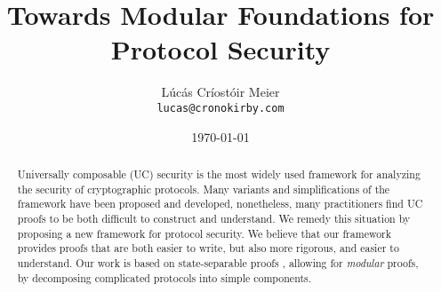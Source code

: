 

\date{\today}
\title{Towards Modular Foundations for\\ Protocol Security}
\author{Lúcás Críostóir Meier\\\texttt{lucas@cronokirby.com}}



\maketitle

\begin{abstract}

Universally composable (UC) security \cite{EPRINT:Canetti00}
is the most widely used framework for analyzing the security of cryptographic
protocols.
Many variants and simplifications of the framework have been proposed and developed,
nonetheless, many practitioners find UC proofs to be both difficult
to construct and understand.
We remedy this situation by proposing a new framework for protocol security.
We believe that our framework provides proofs that are both
easier to write, but also more rigorous, and easier to understand.
Our work is based on state-separable proofs
\cite{AC:BDFKK18},
allowing for \emph{modular} proofs, by decomposing
complicated protocols into simple components.
\end{abstract}










{\small }
\clearpage
\appendix



